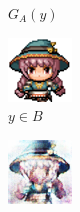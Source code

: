 \documentclass{beamer}
\begin{document}
\begin{frame}
\begin{figure}[htb]
\begin{subfigure}[b]{0.23\linewidth}
        \caption{$G_A(y)$}
      \end{subfigure}
      \begin{subfigure}[b]{0.23\linewidth}
        \includegraphics[width=\linewidth]{exp2_epoch060_real_B.png}
        \caption{$y \in B$}
      \end{subfigure}
      \begin{subfigure}[b]{0.23\linewidth}
        \includegraphics[width=\linewidth]{exp2_epoch060_fake_A.png}

\end{subfigure}
\end{figure}
\end{frame}
\end{document}

